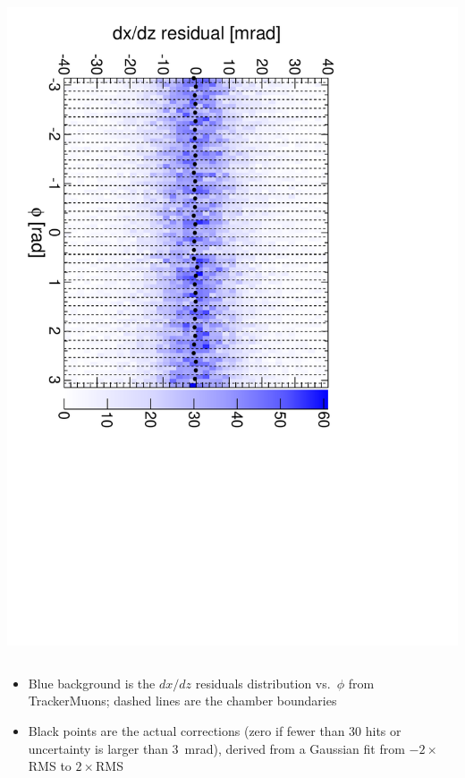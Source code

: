 \documentclass[compress]{beamer}
\begin{document}
\begin{frame}
\begin{columns}
\includegraphics[height=\linewidth, angle=90]{iter02_mem32.pdf}
\end{columns}

\begin{itemize}
\item Blue background is the $dx/dz$ residuals distribution
  vs.\ $\phi$ from TrackerMuons; dashed lines are the chamber boundaries
\item Black points are the actual corrections (zero if fewer than 30
  hits or uncertainty is larger than 3~mrad), derived from a Gaussian
  fit from $-2\times$RMS to $2\times$RMS
\end{itemize}
\end{frame}
\end{document}
